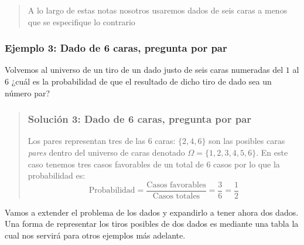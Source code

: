 \documentclass[
]{book}
\newenvironment{Ejemplo}
{\begin{mdframed}[
  linecolor=ejemplocolor,
  skipabove=12pt,
  skipbelow=12pt,
  roundcorner=20pt,
  splittopskip=2\topsep]}
{\end{mdframed}}
\begin{document}
\begin{quote}
A lo largo de estas notas nosotros usaremos dados de seis caras a menos que se especifique lo contrario
\end{quote}

\begin{Ejemplo}
\hypertarget{ejemplo-3-dado-de-6-caras-pregunta-por-par}{%
\subsubsection{Ejemplo 3: Dado de 6 caras, pregunta por
par}\label{ejemplo-3-dado-de-6-caras-pregunta-por-par}}

Volvemos al universo de un tiro de un dado justo de seis caras numeradas
del \(1\) al \(6\) ¿cuál es la probabilidad de que el resultado de dicho
tiro de dado sea un número par?

\begin{quote}
\hypertarget{soluciuxf3n-3-dado-de-6-caras-pregunta-por-par}{%
\subsubsection{Solución 3: Dado de 6 caras, pregunta por
par}\label{soluciuxf3n-3-dado-de-6-caras-pregunta-por-par}}

Los pares representan tres de las 6 caras: \(\{2,4,6\}\) son las
posibles caras \emph{pares} dentro del universo de caras denotado
\(\Omega = \{1,2,3,4,5,6\}\). En este caso tenemos tres casos favorables
de un total de 6 casos por lo que la probabilidad es: \[
\textrm{Probabilidad} = \dfrac{\text{Casos favorables}}{\text{Casos totales}} = \dfrac{3}{6} = \dfrac{1}{2}
\]
\end{quote}
\end{Ejemplo}

Vamos a extender el problema de los dados y expandirlo a tener ahora dos dados. Una forma de representar los tiros posibles de dos dados es mediante una tabla la cual nos servirá para otros ejemplos más adelante.
\end{document}
